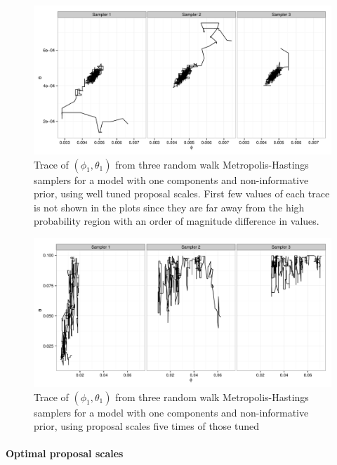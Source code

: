 \begin{figure}
  \includegraphics[width=\linewidth]{fig/PET_MH_Path.pdf}
  \caption{Trace of $(\phi_1,\theta_1)$ from three random walk
    Metropolis-Hastings samplers for a \pet model with one components and
    non-informative prior, using well tuned proposal scales. First few values
    of each trace is not shown in the plots since they are far away from the
    high probability region with an order of magnitude difference in values.}
  \label{fig:pet mh tuned}
\end{figure}

\begin{figure}
  \includegraphics[width=\linewidth]{fig/PET_MH_H_Path.pdf}
  \caption{Trace of $(\phi_1,\theta_1)$ from three random walk
    Metropolis-Hastings samplers for a \pet model with one components and
    non-informative prior, using proposal scales five times of those tuned}
  \label{fig:pet mh untuned}
\end{figure}

\paragraph{Optimal proposal scales}


